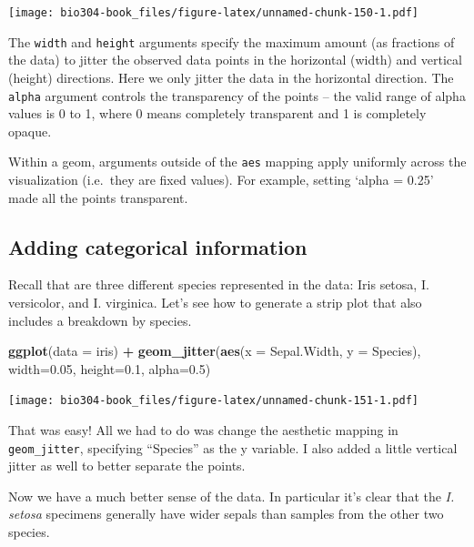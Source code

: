 \documentclass[]{book}
\newenvironment{Shaded}{\begin{snugshade}}{\end{snugshade}}
\newcommand{\DataTypeTok}[1]{\textcolor[rgb]{0.13,0.29,0.53}{#1}}
\newcommand{\FloatTok}[1]{\textcolor[rgb]{0.00,0.00,0.81}{#1}}
\newcommand{\KeywordTok}[1]{\textcolor[rgb]{0.13,0.29,0.53}{\textbf{#1}}}
\newcommand{\NormalTok}[1]{#1}
\newcommand{\OperatorTok}[1]{\textcolor[rgb]{0.81,0.36,0.00}{\textbf{#1}}}
\newcommand{\StringTok}[1]{\textcolor[rgb]{0.31,0.60,0.02}{#1}}
\theoremstyle{definition}
\theoremstyle{definition}
\theoremstyle{definition}
\theoremstyle{remark}
\begin{document}
\texttt{[image: bio304-book\_files/figure-latex/unnamed-chunk-150-1.pdf]}

The \texttt{width} and \texttt{height} arguments specify the maximum
amount (as fractions of the data) to jitter the observed data points in
the horizontal (width) and vertical (height) directions. Here we only
jitter the data in the horizontal direction. The \texttt{alpha} argument
controls the transparency of the points -- the valid range of alpha
values is 0 to 1, where 0 means completely transparent and 1 is
completely opaque.

Within a geom, arguments outside of the \texttt{aes} mapping apply
uniformly across the visualization (i.e.~they are fixed values). For
example, setting `alpha = 0.25' made all the points transparent.

\hypertarget{adding-categorical-information}{%
\subsection{Adding categorical
information}\label{adding-categorical-information}}

Recall that are three different species represented in the data: Iris
setosa, I. versicolor, and I. virginica. Let's see how to generate a
strip plot that also includes a breakdown by species.

\begin{Shaded}
\begin{Highlighting}[]
\KeywordTok{ggplot}\NormalTok{(}\DataTypeTok{data =}\NormalTok{ iris) }\OperatorTok{+}\StringTok{ }
\StringTok{  }\KeywordTok{geom_jitter}\NormalTok{(}\KeywordTok{aes}\NormalTok{(}\DataTypeTok{x =}\NormalTok{ Sepal.Width, }\DataTypeTok{y =}\NormalTok{ Species),}
              \DataTypeTok{width=}\FloatTok{0.05}\NormalTok{, }\DataTypeTok{height=}\FloatTok{0.1}\NormalTok{, }\DataTypeTok{alpha=}\FloatTok{0.5}\NormalTok{)}
\end{Highlighting}
\end{Shaded}

\texttt{[image: bio304-book\_files/figure-latex/unnamed-chunk-151-1.pdf]}

That was easy! All we had to do was change the aesthetic mapping in
\texttt{geom\_jitter}, specifying ``Species'' as the y variable. I also
added a little vertical jitter as well to better separate the points.

Now we have a much better sense of the data. In particular it's clear
that the \emph{I. setosa} specimens generally have wider sepals than
samples from the other two species.
\end{document}
